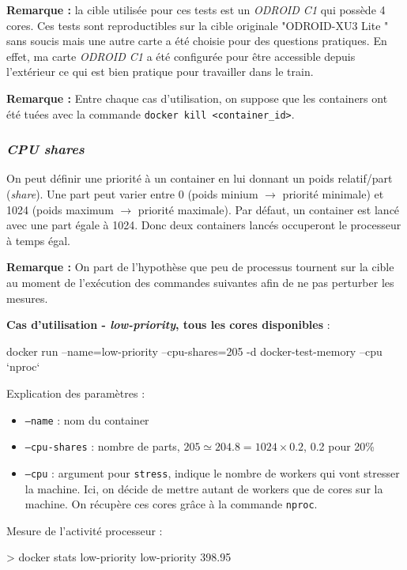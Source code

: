 \documentclass[11pt,a4paper,oneside]{report}
\newcommand{\code}[1]{\texttt{#1}}
\newcommand{\odroid}{ODROID-XU3 Lite }
\begin{document}
\textbf{Remarque :} la cible utilisée pour ces tests est un \textit{ODROID C1} qui possède 4 cores. Ces tests sont reproductibles sur la cible originale "\odroid" sans soucis mais une autre carte a été choisie pour des questions pratiques. En effet, ma carte \textit{ODROID C1} a été configurée pour être accessible depuis l'extérieur ce qui est bien pratique pour travailler dans le train.

\textbf{Remarque :} Entre chaque cas d'utilisation, on suppose que les containers ont été tuées avec la commande \code{docker kill <container\_id>}.


\subsubsection{\textit{CPU shares}}
On peut définir une priorité à un container en lui donnant un poids relatif/part (\textit{share}). Une part peut varier entre 0 (poids minium $\to$ priorité minimale) et 1024 (poids maximum $\to$ priorité maximale). Par défaut, un container est lancé avec une part égale à 1024. Donc deux containers lancés occuperont le processeur à temps égal.


\textbf{Remarque :} On part de l'hypothèse que peu de processus tournent sur la cible au moment de l'exécution des commandes suivantes afin de ne pas perturber les mesures.

\textbf{Cas d'utilisation - \textit{low-priority}, tous les cores disponibles} : 
\begin{textcode}
docker run --name=low-priority --cpu-shares=205 -d docker-test-memory --cpu `nproc`
\end{textcode}

Explication des paramètres :
\begin{itemize}
\item \code{--name} : nom du container
\item \code{--cpu-shares} : nombre de parts, $205 \simeq 204.8 = 1024 \times 0.2$, 0.2 pour 20\%
\item \code{--cpu} : argument pour \code{stress}, indique le nombre de workers qui vont stresser la machine. Ici, on décide de mettre autant de workers que de cores sur la machine. On récupère ces cores grâce à la commande \code{nproc}.
\end{itemize}

Mesure de l'activité processeur :
\begin{bashcode}
> docker stats low-priority
low-priority   398.95%
\end{bashcode}
\end{document}
